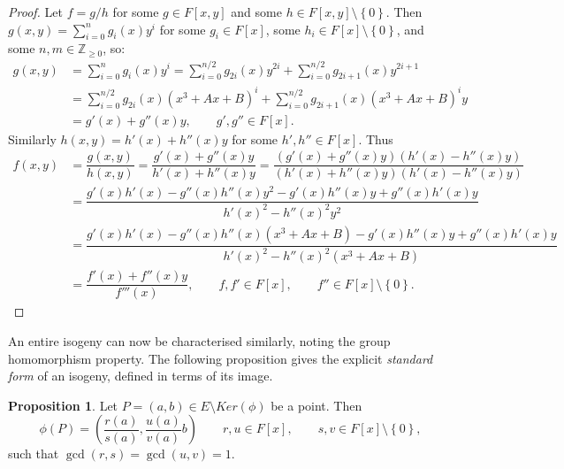 \documentclass{article}
\newcommand{\Z}{\mathbb{Z}}
\newcommand{\rb}[1]{\left( #1 \right)}
\renewcommand{\sb}[1]{\left[ #1 \right]}
\newcommand{\cb}[1]{\left\{ #1 \right\}}
\theoremstyle{definition}
\newtheorem{proposition}{Proposition}[subsection]
\begin{document}
\begin{proof}
Let $ f = g / h $ for some $ g \in F\sb{x, y} $ and some $ h \in F\sb{x, y} \setminus \cb{0} $. Then $ g\rb{x, y} = \sum_{i = 0}^n g_i\rb{x}y^i $ for some $ g_i \in F\sb{x} $, some $ h_i \in F\sb{x} \setminus \cb{0} $, and some $ n, m \in \Z_{\ge 0} $, so:
\begin{align*}
g\rb{x, y}
& = \sum_{i = 0}^n g_i\rb{x}y^i
= \sum_{i = 0}^{n / 2} g_{2i}\rb{x}y^{2i} + \sum_{i = 0}^{n / 2} g_{2i + 1}\rb{x}y^{2i + 1} \\
& = \sum_{i = 0}^{n / 2} g_{2i}\rb{x}\rb{x^3 + Ax + B}^i + \sum_{i = 0}^{n / 2} g_{2i + 1}\rb{x}\rb{x^3 + Ax + B}^iy \\
& = g'\rb{x} + g''\rb{x}y, \qquad g', g'' \in F\sb{x}.
\end{align*}
Similarly $ h\rb{x, y} = h'\rb{x} + h''\rb{x}y $ for some $ h', h'' \in F\sb{x} $. Thus
\begin{align*}
f\rb{x, y}
& = \dfrac{g\rb{x, y}}{h\rb{x, y}}
= \dfrac{g'\rb{x} + g''\rb{x}y}{h'\rb{x} + h''\rb{x}y}
= \dfrac{\rb{g'\rb{x} + g''\rb{x}y}\rb{h'\rb{x} - h''\rb{x}y}}{\rb{h'\rb{x} + h''\rb{x}y}\rb{h'\rb{x} - h''\rb{x}y}} \\
& = \dfrac{g'\rb{x}h'\rb{x} - g''\rb{x}h''\rb{x}y^2 - g'\rb{x}h''\rb{x}y + g''\rb{x}h'\rb{x}y}{h'\rb{x}^2 - h''\rb{x}^2y^2} \\
& = \dfrac{g'\rb{x}h'\rb{x} - g''\rb{x}h''\rb{x}\rb{x^3 + Ax + B} - g'\rb{x}h''\rb{x}y + g''\rb{x}h'\rb{x}y}{h'\rb{x}^2 - h''\rb{x}^2\rb{x^3 + Ax + B}} \\
& = \dfrac{f'\rb{x} + f''\rb{x}y}{f'''\rb{x}}, \qquad f, f' \in F\sb{x}, \qquad f'' \in F\sb{x} \setminus \cb{0}.
\end{align*}
\end{proof}

\pagebreak

An entire isogeny can now be characterised similarly, noting the group homomorphism property. The following proposition gives the explicit \emph{standard form} of an isogeny, defined in terms of its image.

\begin{proposition}
Let $ P = \rb{a, b} \in E \setminus Ker\rb{\phi} $ be a point. Then
$$ \phi\rb{P} = \rb{\dfrac{r\rb{a}}{s\rb{a}}, \dfrac{u\rb{a}}{v\rb{a}}b} \qquad r, u \in F\sb{x}, \qquad s, v \in F\sb{x} \setminus \cb{0}, $$
such that $ \gcd\rb{r, s} = \gcd\rb{u, v} = 1 $.
\end{proposition}
\end{document}

